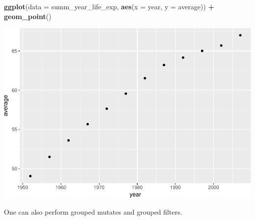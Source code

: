 \documentclass[12pt,]{article}
\newenvironment{Shaded}{\begin{snugshade}}{\end{snugshade}}
\newcommand{\KeywordTok}[1]{\textcolor[rgb]{0.13,0.29,0.53}{\textbf{#1}}}
\newcommand{\DataTypeTok}[1]{\textcolor[rgb]{0.13,0.29,0.53}{#1}}
\newcommand{\StringTok}[1]{\textcolor[rgb]{0.31,0.60,0.02}{#1}}
\newcommand{\OperatorTok}[1]{\textcolor[rgb]{0.81,0.36,0.00}{\textbf{#1}}}
\newcommand{\NormalTok}[1]{#1}
\begin{document}
\begin{Shaded}
\begin{Highlighting}[]
\KeywordTok{ggplot}\NormalTok{(}\DataTypeTok{data =}\NormalTok{ summ_year_life_exp, }
       \KeywordTok{aes}\NormalTok{(}\DataTypeTok{x =}\NormalTok{ year, }\DataTypeTok{y =}\NormalTok{ average)) }\OperatorTok{+}\StringTok{ }
\StringTok{  }\KeywordTok{geom_point}\NormalTok{()}
\end{Highlighting}
\end{Shaded}

\includegraphics{Intro_data_wrangling_files/figure-latex/summ_cont-2.pdf}

One can also perform grouped mutates and grouped filters.
\end{document}

